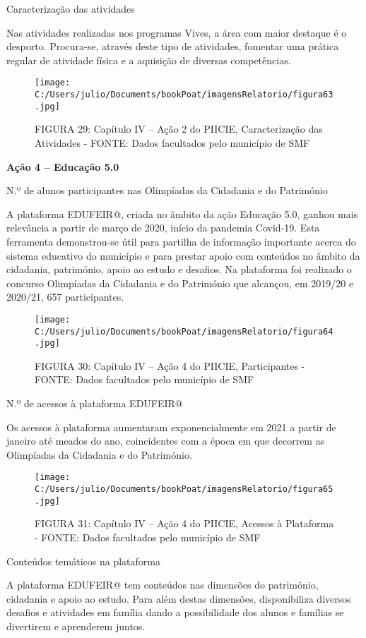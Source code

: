 \documentclass[
]{book}
\begin{document}
Caracterização das atividades

Nas atividades realizadas nos programas Vives, a área com maior destaque é o desporto. Procura-se, através deste tipo de atividades, fomentar uma prática regular de atividade física e a aquisição de diversas competências.

\begin{figure}
\centering
\texttt{[image: C:/Users/julio/Documents/bookPoat/imagensRelatorio/figura63.jpg]}
\caption{FIGURA 29: Capítulo IV -- Ação 2 do PIICIE, Caracterização das Atividades - FONTE: Dados facultados pelo município de SMF}
\end{figure}

\textbf{Ação 4 -- Educação 5.0}

N.º de alunos participantes nas Olimpíadas da Cidadania e do Património

A plataforma EDUFEIR@, criada no âmbito da ação Educação 5.0, ganhou mais relevância a partir de março de 2020, início da pandemia Covid-19. Esta ferramenta demonstrou-se útil para partilha de informação importante acerca do sistema educativo do município e para prestar apoio com conteúdos no âmbito da cidadania, património, apoio ao estudo e desafios. Na plataforma foi realizado o concurso Olimpíadas da Cidadania e do Património que alcançou, em 2019/20 e 2020/21, 657 participantes.

\begin{figure}
\centering
\texttt{[image: C:/Users/julio/Documents/bookPoat/imagensRelatorio/figura64.jpg]}
\caption{FIGURA 30: Capítulo IV -- Ação 4 do PIICIE, Participantes - FONTE: Dados facultados pelo município de SMF}
\end{figure}

N.º de acessos à plataforma EDUFEIR@

Os acessos à plataforma aumentaram exponencialmente em 2021 a partir de janeiro até meados do ano, coincidentes com a época em que decorrem as Olimpíadas da Cidadania e do Património.

\begin{figure}
\centering
\texttt{[image: C:/Users/julio/Documents/bookPoat/imagensRelatorio/figura65.jpg]}
\caption{FIGURA 31: Capítulo IV -- Ação 4 do PIICIE, Acessos à Plataforma - FONTE: Dados facultados pelo município de SMF}
\end{figure}

Conteúdos temáticos na plataforma

A plataforma EDUFEIR@ tem conteúdos nas dimensões do património, cidadania e apoio ao estudo. Para além destas dimensões, disponibiliza diversos desafios e atividades em família dando a possibilidade dos alunos e famílias se divertirem e aprenderem juntos.
\end{document}
